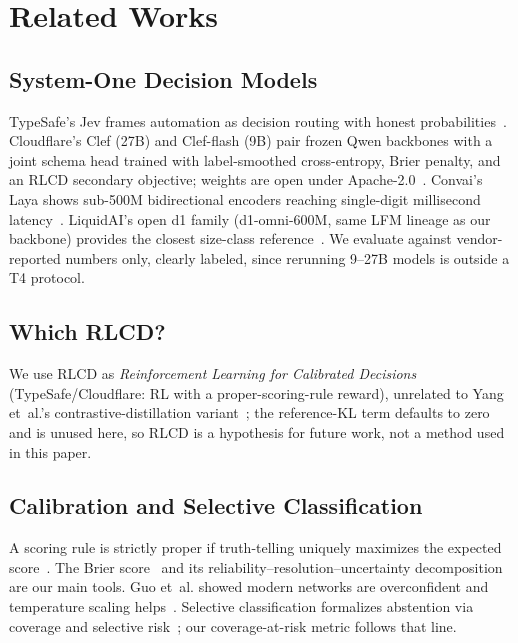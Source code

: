 \section{Related Works}
\subsection{System-One Decision Models}
TypeSafe's Jev frames automation as decision routing with honest
probabilities~\cite{typesafe-jev}. Cloudflare's Clef (27B) and Clef-flash (9B)
pair frozen Qwen backbones with a joint schema head trained with label-smoothed
cross-entropy, Brier penalty, and an RLCD secondary objective; weights are open
under Apache-2.0~\cite{cloudflare-clef}. Convai's Laya shows sub-500M
bidirectional encoders reaching single-digit millisecond latency~\cite{convai-laya}.
LiquidAI's open d1 family (d1-omni-600M, same LFM lineage as our backbone)
provides the closest size-class reference~\cite{liquid-d1}. We evaluate
against vendor-reported numbers only, clearly labeled, since rerunning 9--27B
models is outside a T4 protocol.

\subsection{Which RLCD?}
 We use RLCD as \textit{Reinforcement Learning for Calibrated Decisions}
 (TypeSafe/Cloudflare: RL with a proper-scoring-rule reward), unrelated to
 Yang et~al.'s contrastive-distillation variant~\cite{yang2024rlcd}; the
 reference-KL term defaults to zero and is unused here, so RLCD is a
 hypothesis for future work, not a method used in this paper.

\subsection{Calibration and Selective Classification}
A scoring rule is strictly proper if truth-telling uniquely maximizes the
expected score~\cite{gneiting2007strictly}. The Brier score~\cite{brier1950verification} and its
reliability--resolution--uncertainty decomposition~\cite{murphy1973new} are our main
tools. Guo et~al. showed modern networks are overconfident and temperature
scaling helps~\cite{guo2017calibration}. Selective classification formalizes
abstention via coverage and selective risk~\cite{geifman2017selective}; our
coverage-at-risk metric follows that line.

